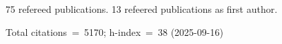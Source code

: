 75 refereed publications. 13 refeered publications as first author.

Total citations~=~5170; h-index~=~38 (2025-09-16)